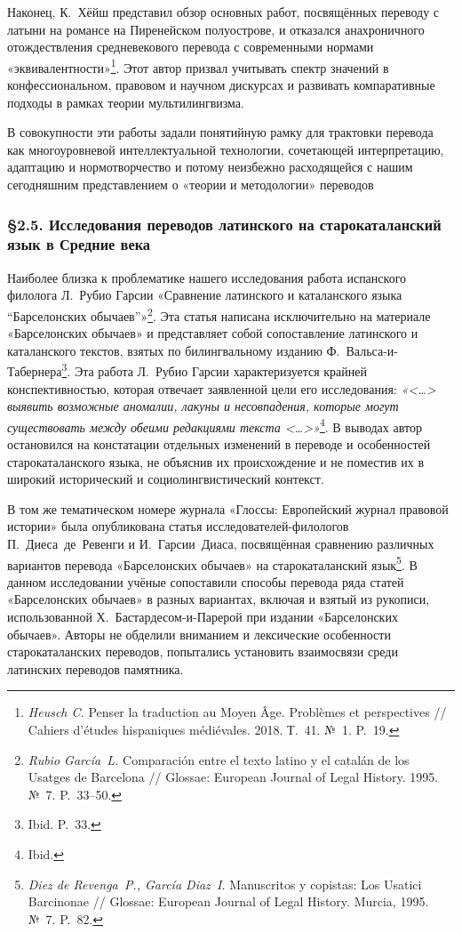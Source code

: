 Наконец, К.~Хёйш представил обзор основных работ, посвящённых переводу с латыни на романсе на Пиренейском полуострове, и отказался анахроничного отождествления средневекового перевода с современными нормами «эквивалентности»\footnote{\emph{Heusch C.} Penser la traduction au Moyen Âge. Problèmes et perspectives // Cahiers d’études hispaniques médiévales. 2018. Т.~41. №~1. P.~19.}. Этот автор призвал учитывать спектр значений в конфессиональном, правовом и научном дискурсах и развивать компаративные подходы в рамках теории мультилингвизма.

В совокупности эти работы задали понятийную рамку для трактовки перевода как многоуровневой интеллектуальной технологии, сочетающей интерпретацию, адаптацию и нормотворчество и потому неизбежно расходящейся с нашим сегодняшним представлением о «теории и методологии» переводов

\subsubsection*{§2.5. Исследования переводов латинского на старокаталанский язык в Средние века}

Наиболее близка к проблематике нашего исследования работа испанского филолога Л.~Рубио Гарсии «Сравнение латинского и каталанского языка “Барселонских обычаев”»\footnote{\emph{Rubio García~L.} Comparación entre el texto latino y el catalán de los Usatges de Barcelona // Glossae: European Journal of Legal History. 1995. №~7. P.~33--50.}. Эта статья написана исключительно на материале «Барселонских обычаев» и представляет собой сопоставление латинского и каталанского текстов, взятых по билингвальному изданию Ф.~Вальса-и-Табернера\footnote{Ibid. P.~33.}. Эта работа Л.~Рубио Гарсии характеризуется крайней конспективностью, которая отвечает заявленной цели его исследования: \emph{«<…> выявить возможные аномалии, лакуны и несовпадения, которые могут существовать между обеими редакциями текста <…>»}\footnote{Ibid.}. В выводах автор остановился на констатации отдельных изменений в переводе и особенностей старокаталанского языка, не объяснив их происхождение и не поместив их в широкий исторический и социолингвистический контекст.

В том же тематическом номере журнала «Глоссы: Европейский журнал правовой истории» была опубликована статья исследователей-филологов П.~Диеса~де~Ревенги и И.~Гарсии~Диаса, посвящённая сравнению различных вариантов перевода «Барселонских обычаев» на старокаталанский язык\footnote{\emph{Diez de Revenga~P., García Diaz~I.} Manuscritos y copistas: Los Usatici Barcinonae // Glossae: European Journal of Legal History. Murcia, 1995. №~7. P.~82.}. В данном исследовании учёные сопоставили способы перевода ряда статей «Барселонских обычаев» в разных вариантах, включая и взятый из рукописи, использованной Х.~Бастардесом-и-Парерой при издании «Барселонских обычаев». Авторы не обделили вниманием и лексические особенности старокаталанских переводов, попытались установить взаимосвязи среди латинских переводов памятника.

